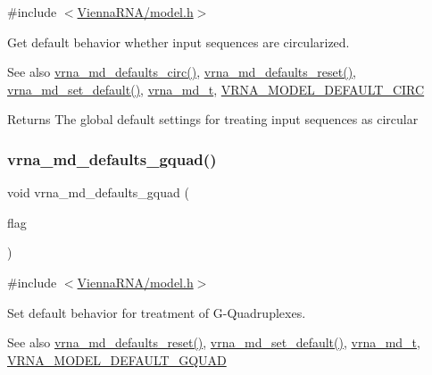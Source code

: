 {\ttfamily \#include $<$\mbox{\hyperlink{model_8h}{Vienna\+R\+N\+A/model.\+h}}$>$}



Get default behavior whether input sequences are circularized. 

\begin{DoxySeeAlso}{See also}
\mbox{\hyperlink{group__model__details_ga4e1deb3e91a8a99e5c6dd905a5eb0186}{vrna\+\_\+md\+\_\+defaults\+\_\+circ()}}, \mbox{\hyperlink{group__model__details_ga70834424cf804d149937de89f80ceb45}{vrna\+\_\+md\+\_\+defaults\+\_\+reset()}}, \mbox{\hyperlink{group__model__details_ga8ac6ff84936282436f822644bf841f66}{vrna\+\_\+md\+\_\+set\+\_\+default()}}, \mbox{\hyperlink{group__model__details_ga1f8a10e12a0a1915f2a4eff0b28ea17c}{vrna\+\_\+md\+\_\+t}}, \mbox{\hyperlink{group__model__details_ga22059033db7bcd875c51fec32425490a}{V\+R\+N\+A\+\_\+\+M\+O\+D\+E\+L\+\_\+\+D\+E\+F\+A\+U\+L\+T\+\_\+\+C\+I\+RC}} 
\end{DoxySeeAlso}
\begin{DoxyReturn}{Returns}
The global default settings for treating input sequences as circular 
\end{DoxyReturn}
\mbox{\label{group__model__details_ga0685ca2aeb39af76f2421fc308163dce}} 
\subsubsection{\texorpdfstring{vrna\+\_\+md\+\_\+defaults\+\_\+gquad()}{vrna\_md\_defaults\_gquad()}}
{\footnotesize\ttfamily void vrna\+\_\+md\+\_\+defaults\+\_\+gquad (\begin{DoxyParamCaption}\item[{int}]{flag }\end{DoxyParamCaption})}



{\ttfamily \#include $<$\mbox{\hyperlink{model_8h}{Vienna\+R\+N\+A/model.\+h}}$>$}



Set default behavior for treatment of G-\/\+Quadruplexes. 

\begin{DoxySeeAlso}{See also}
\mbox{\hyperlink{group__model__details_ga70834424cf804d149937de89f80ceb45}{vrna\+\_\+md\+\_\+defaults\+\_\+reset()}}, \mbox{\hyperlink{group__model__details_ga8ac6ff84936282436f822644bf841f66}{vrna\+\_\+md\+\_\+set\+\_\+default()}}, \mbox{\hyperlink{group__model__details_ga1f8a10e12a0a1915f2a4eff0b28ea17c}{vrna\+\_\+md\+\_\+t}}, \mbox{\hyperlink{group__model__details_ga793ed812e86f43799b14b2deee917f23}{V\+R\+N\+A\+\_\+\+M\+O\+D\+E\+L\+\_\+\+D\+E\+F\+A\+U\+L\+T\+\_\+\+G\+Q\+U\+AD}} 
\end{DoxySeeAlso}

